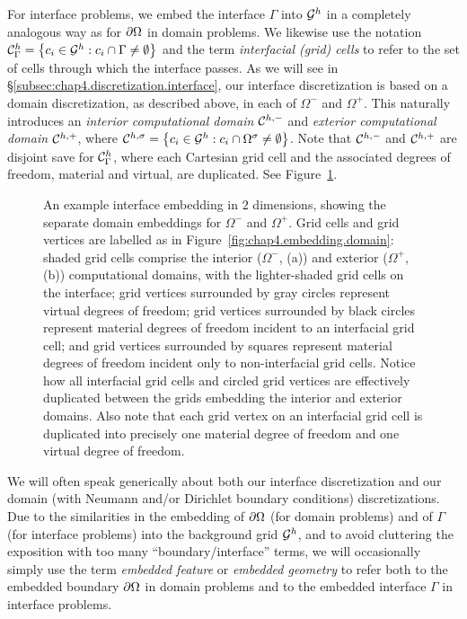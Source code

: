 For interface problems, we embed the interface $\Gamma$ into $\mathcal{G}^h$ in a completely analogous way as for $\partial\Omega$ in domain problems. We likewise use the notation $\mathcal{C}_{\Gamma}^h = \left\lbrace  c_i \in \mathcal{G}^h : c_i \cap \Gamma \neq \emptyset  \right\rbrace$ and the term \emph{interfacial (grid) cells} to refer to the set of cells through which the interface passes. As we will see in \S\ref{subsec:chap4.discretization.interface}, our interface discretization is based on a domain discretization, as described above, in each of $\Omega^-$ and $\Omega^+$. This naturally introduces an \emph{interior computational domain} $\mathcal{C}^{h,-}$ and \emph{exterior computational domain} $\mathcal{C}^{h,+}$, where $\mathcal{C}^{h,\sigma} = \left\lbrace  c_i \in \mathcal{G}^h : c_i \cap \Omega^{\sigma} \neq \emptyset  \right\rbrace$. Note that $\mathcal{C}^{h,-}$ and $\mathcal{C}^{h,+}$ are disjoint save for $\mathcal{C}_{\Gamma}^h$, where each Cartesian grid cell and the associated degrees of freedom, material and virtual, are duplicated. See Figure~\ref{fig:chap4.embedding.interface}.

\setlength{\figureheight}{0.50\textwidth}
\begin{figure}[htb]
\centering
{}
\caption{An example interface embedding in $2$ dimensions, showing the separate domain embeddings for $\Omega^-$ and $\Omega^+$. Grid cells and grid vertices are labelled as in Figure~\ref{fig:chap4.embedding.domain}: shaded grid cells comprise the interior ($\Omega^-$, (a)) and exterior ($\Omega^+$, (b)) computational domains, with the lighter-shaded grid cells on the interface; grid vertices surrounded by gray circles represent virtual degrees of freedom; grid vertices surrounded by black circles represent material degrees of freedom incident to an interfacial grid cell; and grid vertices surrounded by squares represent material degrees of freedom incident only to non-interfacial grid cells. Notice how all interfacial grid cells and circled grid vertices are effectively duplicated between the grids embedding the interior and exterior domains. Also note that each grid vertex on an interfacial grid cell is duplicated into precisely one material degree of freedom and one virtual degree of freedom.}
\label{fig:chap4.embedding.interface}
\end{figure}

We will often speak generically about both our interface discretization and our domain (with Neumann and/or Dirichlet boundary conditions) discretizations. Due to the similarities in the embedding of $\partial\Omega$ (for domain problems) and of $\Gamma$ (for interface problems) into the background grid $\mathcal{G}^h$, and to avoid cluttering the exposition with too many ``boundary/interface'' terms, we will occasionally simply use the term \emph{embedded feature} or \emph{embedded geometry} to refer both to the embedded boundary $\partial\Omega$ in domain problems and to the embedded interface $\Gamma$ in interface problems.

